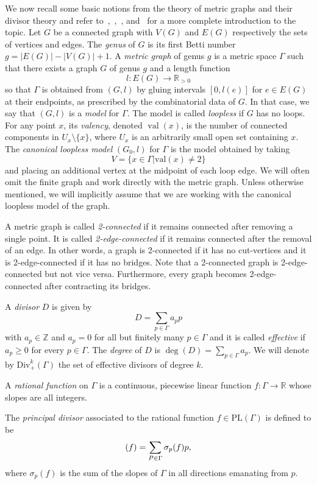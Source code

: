 \documentclass[11pt]{article}
\theoremstyle{definition}
\numberwithin{equation}{section}
\theoremstyle{definition}
\newcommand{\R}{\mathbb{R}}
\newcommand{\ZZ}{\mathbb{Z}}
\newcommand{\Ga}{\Gamma}
\DeclareMathOperator{\val}{val}
\let\ddiv\relax
\DeclareMathOperator{\ddiv}{div}
\begin{document}
We now recall some basic notions from the theory of metric graphs and their divisor theory and refer to~\cite{BN09},~\cite{BF11},~\cite{BC}, and~\cite{Len_Survey}  for a more complete introduction to the topic. 	
Let $G$ be a connected graph with $V(G)$ and $E(G)$  respectively the sets of vertices and edges. The \emph{genus} of $G$ is its  first Betti number $g=|E(G)|-|V(G)|+1$. 
A \emph{metric graph} of genus $g$ is a metric space $\Ga$ such that there exists a graph $G$ of genus $g$ and a length function \[l\colon E(G)\to \R_{>0}\]
so that $\Ga$ is obtained from $(G,l)$ by gluing intervals $[0,l(e)]$ for  $e\in E(G)$ at their endpoints, as prescribed by the combinatorial data of $G$. In that case, we say that $(G,l)$ is a \emph{model} for $\Ga$.  The model is called \emph{loopless} if $G$ has no loops. 
  For any point $x$, its \emph{valency}, denoted  $\val(x)$, is  the number of connected components in $U_x\setminus\{x\}$, where $U_x$ is an arbitrarily small open set containing $x$.   
  The \emph{canonical loopless model} $(G_0,l)$ for $\Ga$ is the model obtained by taking
\[
V=\{x\in\Ga|\mathrm{val}(x)\ne 2 \}
\]
and placing an additional vertex at the midpoint of each loop edge. We will often omit the finite graph and work directly with the metric graph. Unless otherwise mentioned, we will implicitly assume that we are working with the canonical  loopless model of the graph. 


A metric graph is called \emph{2-connected} if it remains connected after removing a single point. It is called \emph{2-edge-connected} if it remains connected after the removal of an edge. In other words, a graph is 2-connected if it has no cut-vertices and it is  2-edge-connected if it has no bridges. Note that a 2-connected graph is 2-edge-connected but not vice versa. Furthermore, every graph becomes 2-edge-connected after contracting its bridges. 
 
 A \emph{divisor} $D$ is given by \[D=\sum_{p\in \Gamma}a_pp\] with $a_p\in\ZZ$ and $a_p=0$ for all but finitely many $p\in \Ga$ and 
it is called \emph{effective} if $a_p\geq 0$ for every $p\in\Ga$.
The \emph{degree} of $D $ is $\deg(D)=\sum_{p\in\Gamma}a_p$. 
We will denote by $ \mathrm{Div}^k_+(\Gamma)$ the set of effective divisors of degree $k$.
 
	A \emph{rational function} on $\Gamma$ is a continuous, piecewise linear function $f\colon \Gamma\to \R$  whose slopes are all integers. 
 
	The \emph{principal divisor} associated to the rational function $f\in \mathrm{PL}(\Gamma)$ is defined to be 
	\[
	\ddiv(f)=\sum_{P\in \Gamma}\sigma_p(f)p,
	\]
	 where $\sigma_p(f)$ is the sum of the slopes of $\Gamma$ in all directions emanating from $p$. 
    
\end{document}

